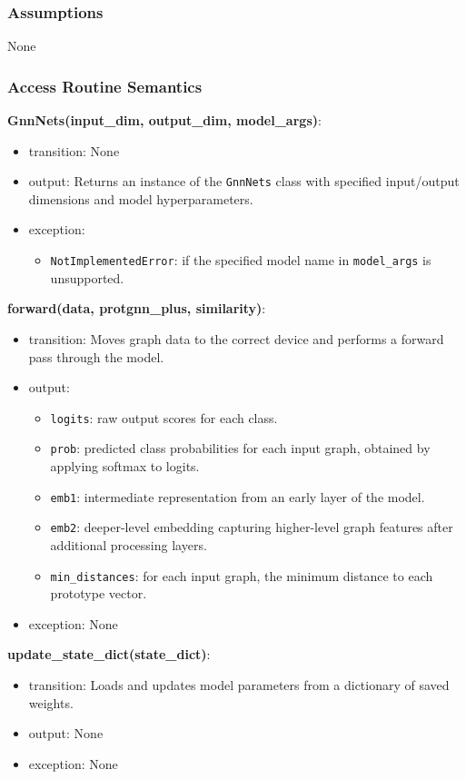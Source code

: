 \documentclass[12pt, titlepage]{article}
\begin{document}
\subsubsection{Assumptions}
None

\subsubsection{Access Routine Semantics}

\noindent \textbf{GnnNets(input\_dim, output\_dim, model\_args)}:
\begin{itemize}
  \item transition: None
  \item output: Returns an instance of the \texttt{GnnNets} class with specified input/output dimensions and model hyperparameters.
  \item exception:     
    \begin{itemize}
      \item \texttt{NotImplementedError}: if the specified model name in \texttt{model\_args} is unsupported.
    \end{itemize}
\end{itemize}

\noindent \textbf{forward(data, protgnn\_plus, similarity)}:
\begin{itemize}
  \item transition: Moves graph data to the correct device and performs a forward pass through the model.
  \item output:
    \begin{itemize}
      \item \texttt{logits}: raw output scores for each class.
      \item \texttt{prob}: predicted class probabilities for each input graph, obtained by applying softmax to logits.
      \item \texttt{emb1}: intermediate representation from an early layer of the model.
      \item \texttt{emb2}: deeper-level embedding capturing higher-level graph features after additional processing layers.
      \item \texttt{min\_distances}: for each input graph, the minimum distance to each prototype vector.
    \end{itemize}
  \item exception: None
\end{itemize}

\noindent \textbf{update\_state\_dict(state\_dict)}:
\begin{itemize}
  \item transition: Loads and updates model parameters from a dictionary of saved weights.
  \item output: None
  \item exception: None
\end{itemize}
\end{document}
